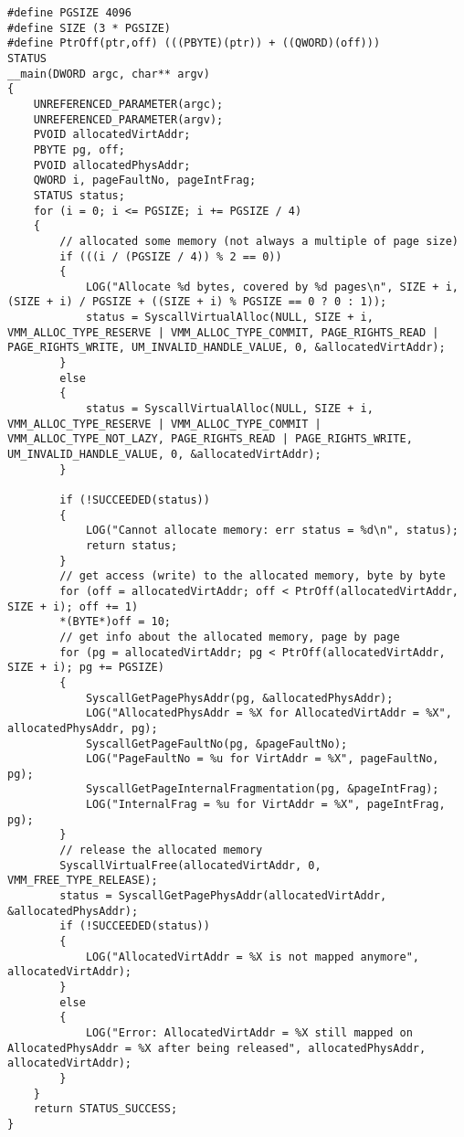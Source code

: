 \begin{lstlisting}
#define PGSIZE 4096
#define SIZE (3 * PGSIZE)
#define PtrOff(ptr,off) (((PBYTE)(ptr)) + ((QWORD)(off)))
STATUS
__main(DWORD argc, char** argv)
{
    UNREFERENCED_PARAMETER(argc);
    UNREFERENCED_PARAMETER(argv);
    PVOID allocatedVirtAddr;
    PBYTE pg, off;
    PVOID allocatedPhysAddr;
    QWORD i, pageFaultNo, pageIntFrag;
    STATUS status;
    for (i = 0; i <= PGSIZE; i += PGSIZE / 4)
    {
        // allocated some memory (not always a multiple of page size)
        if (((i / (PGSIZE / 4)) % 2 == 0))
        {
            LOG("Allocate %d bytes, covered by %d pages\n", SIZE + i, (SIZE + i) / PGSIZE + ((SIZE + i) % PGSIZE == 0 ? 0 : 1));
            status = SyscallVirtualAlloc(NULL, SIZE + i, VMM_ALLOC_TYPE_RESERVE | VMM_ALLOC_TYPE_COMMIT, PAGE_RIGHTS_READ | PAGE_RIGHTS_WRITE, UM_INVALID_HANDLE_VALUE, 0, &allocatedVirtAddr);
        }
        else
        {
            status = SyscallVirtualAlloc(NULL, SIZE + i, VMM_ALLOC_TYPE_RESERVE | VMM_ALLOC_TYPE_COMMIT | VMM_ALLOC_TYPE_NOT_LAZY, PAGE_RIGHTS_READ | PAGE_RIGHTS_WRITE, UM_INVALID_HANDLE_VALUE, 0, &allocatedVirtAddr);
        }

        if (!SUCCEEDED(status))
        {
            LOG("Cannot allocate memory: err status = %d\n", status);
            return status;
        }
        // get access (write) to the allocated memory, byte by byte
        for (off = allocatedVirtAddr; off < PtrOff(allocatedVirtAddr, SIZE + i); off += 1)
        *(BYTE*)off = 10;
        // get info about the allocated memory, page by page
        for (pg = allocatedVirtAddr; pg < PtrOff(allocatedVirtAddr, SIZE + i); pg += PGSIZE)
        {
            SyscallGetPagePhysAddr(pg, &allocatedPhysAddr);
            LOG("AllocatedPhysAddr = %X for AllocatedVirtAddr = %X", allocatedPhysAddr, pg);
            SyscallGetPageFaultNo(pg, &pageFaultNo);
            LOG("PageFaultNo = %u for VirtAddr = %X", pageFaultNo, pg);
            SyscallGetPageInternalFragmentation(pg, &pageIntFrag);
            LOG("InternalFrag = %u for VirtAddr = %X", pageIntFrag, pg);
        }
        // release the allocated memory
        SyscallVirtualFree(allocatedVirtAddr, 0, VMM_FREE_TYPE_RELEASE);
        status = SyscallGetPagePhysAddr(allocatedVirtAddr, &allocatedPhysAddr);
        if (!SUCCEEDED(status))
        {
            LOG("AllocatedVirtAddr = %X is not mapped anymore", allocatedVirtAddr);
        }
        else
        {
            LOG("Error: AllocatedVirtAddr = %X still mapped on AllocatedPhysAddr = %X after being released", allocatedPhysAddr, allocatedVirtAddr);
        }
    }
    return STATUS_SUCCESS;
}
\end{lstlisting}


